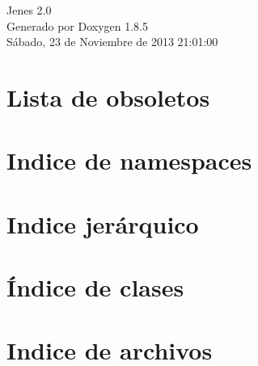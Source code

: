 \documentclass[twoside]{book}
\newcommand{\clearemptydoublepage}{%
  \newpage{\pagestyle{empty}\cleardoublepage}%
}
\begin{document}
\hypersetup{pageanchor=false}
\begin{titlepage}
\vspace*{7cm}
\begin{center}%
{\Large Jenes 2.0 }\\
\vspace*{1cm}
{\large Generado por Doxygen 1.8.5}\\
\vspace*{0.5cm}
{\small Sábado, 23 de Noviembre de 2013 21:01:00}\\
\end{center}
\end{titlepage}
\clearemptydoublepage
\tableofcontents
\clearemptydoublepage
{}
\hypersetup{pageanchor=true}

\chapter{Lista de obsoletos}
\label{deprecated}
\hypertarget{deprecated}{}

\chapter{Indice de namespaces}

\chapter{Indice jerárquico}

\chapter{Índice de clases}

\chapter{Indice de archivos}

\end{document}

